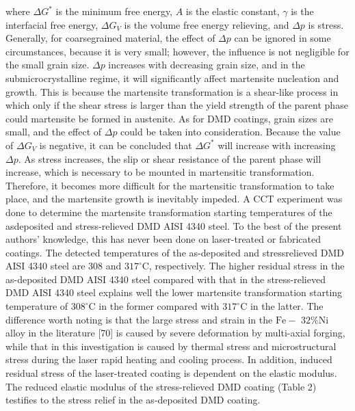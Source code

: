 \documentclass[10pt]{article}
\begin{document}
where $\Delta G^{*}$ is the minimum free energy, $A$ is the elastic constant, $\gamma$ is the interfacial free energy, $\Delta G_{V}$ is the volume free energy relieving, and $\Delta p$ is stress. Generally, for coarsegrained material, the effect of $\Delta p$ can be ignored in some circumstances, because it is very small; however, the influence is not negligible for the small grain size. $\Delta p$ increases with decreasing grain size, and in the submicrocrystalline regime, it will significantly affect martensite nucleation and growth. This is because the martensite transformation is a shear-like process in which only if the shear stress is larger than the yield strength of the parent phase could martensite be formed in austenite. As for DMD coatings, grain sizes are small, and the effect of $\Delta p$ could be taken into consideration. Because the value of $\Delta G_{V}$ is negative, it can be concluded that $\Delta G^{*}$ will increase with increasing $\Delta p$. As stress increases, the slip or shear resistance of the parent phase will increase, which is necessary to be mounted in martensitic transformation. Therefore, it becomes more difficult for the martensitic transformation to take place, and the martensite growth is inevitably impeded. A CCT experiment was done to determine the martensite transformation starting temperatures of the asdeposited and stress-relieved DMD AISI 4340 steel. To the best of the present authors' knowledge, this has never been done on laser-treated or fabricated coatings. The detected temperatures of the as-deposited and stressrelieved DMD AISI 4340 steel are 308 and $317^{\circ} \mathrm{C}$, respectively. The higher residual stress in the as-deposited DMD AISI 4340 steel compared with that in the stress-relieved DMD AISI 4340 steel explains well the lower martensite transformation starting temperature of $308^{\circ} \mathrm{C}$ in the former compared with $317^{\circ} \mathrm{C}$ in the latter. The difference worth noting is that the large stress and strain in the $\mathrm{Fe}-$ $32 \% \mathrm{Ni}$ alloy in the literature [70] is caused by severe deformation by multi-axial forging, while that in this investigation is caused by thermal stress and microstructural stress during the laser rapid heating and cooling process. In addition, induced residual stress of the laser-treated coating is dependent on the elastic modulus. The reduced elastic modulus of the stress-relieved DMD coating (Table 2) testifies to the stress relief in the as-deposited DMD coating.
\end{document}
